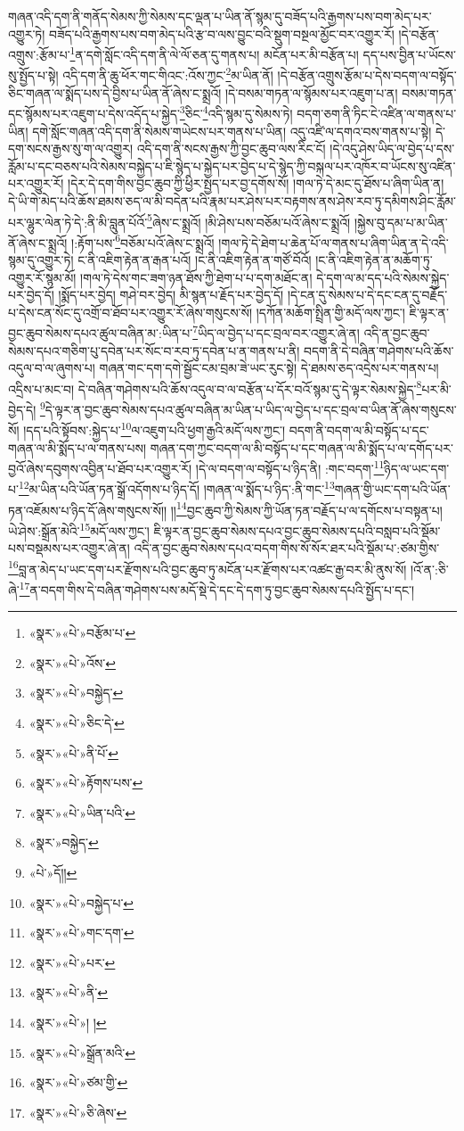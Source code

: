 གཞན་འདི་དག་ནི་གནོད་སེམས་ཀྱི་སེམས་དང་ལྡན་པ་ཡིན་ནོ་སྙམ་དུ་བཟོད་པའི་རྒྱགས་པས་བག་མེད་པར་འགྱུར་ཏེ། བཟོད་པའི་རྒྱགས་པས་བག་མེད་པའི་རྩ་བ་ལས་བྱུང་བའི་སྡུག་བསྔལ་མྱོང་བར་འགྱུར་རོ། །དེ་བརྩོན་འགྲུས་:རྩོམ་པ་\footnote{«སྣར་»«པེ་»བརྩོམ་པ་}ན་དགེ་སློང་འདི་དག་ནི་ལེ་ལོ་ཅན་དུ་གནས་པ། མངོན་པར་མི་བརྩོན་པ། དད་པས་བྱིན་པ་ཡོངས་སུ་སྤྱོད་པ་སྟེ། འདི་དག་ནི་ཆུ་ཕོར་གང་གིའང་:འོས་ཀྱང་\footnote{«སྣར་»«པེ་»འོས་}མ་ཡིན་ནོ། །དེ་བརྩོན་འགྲུས་རྩོམ་པ་དེས་བདག་ལ་བསྟོད་ཅིང་གཞན་ལ་སྨོད་པས་དེ་བྱིས་པ་ཡིན་ནོ་ཞེས་ང་སྨྲའོ། །དེ་བསམ་གཏན་ལ་སྙོམས་པར་འཇུག་པ་ན། བསམ་གཏན་དང་སྙོམས་པར་འཇུག་པ་དེས་འདོད་པ་སྐྱེད་\footnote{«སྣར་»«པེ་»བསྐྱེད་}ཅིང་\footnote{«སྣར་»«པེ་»ཅིང་དེ་}འདི་སྙམ་དུ་སེམས་ཏེ། བདག་ཅག་ནི་ཏིང་ངེ་འཛིན་ལ་གནས་པ་ཡིན། དགེ་སློང་གཞན་འདི་དག་ནི་སེམས་གཡེངས་པར་གནས་པ་ཡིན། འདུ་འཛི་ལ་དགའ་བས་གནས་པ་སྟེ། དེ་དག་སངས་རྒྱས་སུ་ག་ལ་འགྱུར། འདི་དག་ནི་སངས་རྒྱས་ཀྱི་བྱང་ཆུབ་ལས་རིང་ངོ། །དེ་འདུ་ཤེས་ཡིད་ལ་བྱེད་པ་དས་རློམ་པ་དང་བཅས་པའི་སེམས་བསྐྱེད་པ་ཇི་སྙེད་པ་སྐྱེད་པར་བྱེད་པ་དེ་སྙེད་ཀྱི་བསྐལ་པར་འཁོར་བ་ཡོངས་སུ་འཛིན་པར་འགྱུར་རོ། །དེར་དེ་དག་གིས་བྱང་ཆུབ་ཀྱི་ཕྱིར་སྤྱད་པར་བྱ་དགོས་སོ། །གལ་ཏེ་དེ་མང་དུ་ཐོས་པ་ཞིག་ཡིན་ན། དེ་ཡི་གེ་མེད་པའི་ཆོས་ཐམས་ཅད་ལ་མི་བདེན་པའི་རྣམ་པར་ཤེས་པར་བརྟགས་ནས་ཤེས་རབ་ཏུ་དམིགས་ཤིང་རློམ་པར་ལྷུར་ལེན་ཏེ་དེ་:ནི་མི་བླུན་པོའོ་\footnote{«སྣར་»«པེ་»ནི་པོ་}ཞེས་ང་སྨྲའོ། །མི་ཤེས་པས་བཅོམ་པའོ་ཞེས་ང་སྨྲའོ། །སྐྱེས་བུ་དམ་པ་མ་ཡིན་ནོ་ཞེས་ང་སྨྲའོ། །:རྟོག་པས་\footnote{«སྣར་»«པེ་»རྟོགས་པས་}བཅོམ་པའོ་ཞེས་ང་སྨྲའོ། །གལ་ཏེ་དེ་ཐེག་པ་ཆེན་པོ་ལ་གནས་པ་ཞིག་ཡིན་ན་དེ་འདི་སྙམ་དུ་འགྱུར་ཏེ། ང་ནི་འཇིག་རྟེན་ན་རྒན་པའོ། །ང་ནི་འཇིག་རྟེན་ན་གཙོ་བོའོ། །ང་ནི་འཇིག་རྟེན་ན་མཆོག་ཏུ་འགྱུར་རོ་སྙམ་མོ། །གལ་ཏེ་དེས་གང་ཟག་ཉན་ཐོས་ཀྱི་ཐེག་པ་པ་དག་མཐོང་ན། དེ་དག་ལ་མ་དད་པའི་སེམས་སྐྱེད་པར་བྱེད་དོ། །སྨོད་པར་བྱེད། གཤེ་བར་བྱེད། མི་སྙན་པ་རྗོད་པར་བྱེད་དོ། །དེ་ངན་དུ་སེམས་པ་དེ་དང་ངན་དུ་བརྗོད་པ་དེས་ངན་སོང་དུ་འགྲོ་བ་ཐོབ་པར་འགྱུར་རོ་ཞེས་གསུངས་སོ། །དཀོན་མཆོག་སྤྲིན་གྱི་མདོ་ལས་ཀྱང་། ཇི་ལྟར་ན་བྱང་ཆུབ་སེམས་དཔའ་ཚུལ་བཞིན་མ་:ཡིན་པ་\footnote{«སྣར་»«པེ་»ཡིན་པའི་}ཡིད་ལ་བྱེད་པ་དང་བྲལ་བར་འགྱུར་ཞེ་ན། འདི་ན་བྱང་ཆུབ་སེམས་དཔའ་གཅིག་པུ་དབེན་པར་སོང་བ་རབ་ཏུ་དབེན་པ་ན་གནས་པ་ནི། བདག་ནི་དེ་བཞིན་གཤེགས་པའི་ཆོས་འདུལ་བ་ལ་ཞུགས་པ། གཞན་གང་དག་དགེ་སྦྱོང་ངམ་བྲམ་ཟེ་ཡང་རུང་སྟེ། དེ་ཐམས་ཅད་འདྲེས་པར་གནས་པ། འདྲིས་པ་མང་བ། དེ་བཞིན་གཤེགས་པའི་ཆོས་འདུལ་བ་ལ་བརྩོན་པ་དོར་བའོ་སྙམ་དུ་དེ་ལྟར་སེམས་སྐྱེད་\footnote{«སྣར་»བསྐྱེད་}པར་མི་བྱེད་དེ། \footnote{«པེ་»དོ།། }དེ་ལྟར་ན་བྱང་ཆུབ་སེམས་དཔའ་ཚུལ་བཞིན་མ་ཡིན་པ་ཡིད་ལ་བྱེད་པ་དང་བྲལ་བ་ཡིན་ནོ་ཞེས་གསུངས་སོ། །དད་པའི་སྟོབས་:སྐྱེད་པ་\footnote{«སྣར་»«པེ་»བསྐྱེད་པ་}ལ་འཇུག་པའི་ཕྱག་རྒྱའི་མདོ་ལས་ཀྱང་། བདག་ནི་བདག་ལ་མི་བསྟོད་པ་དང་གཞན་ལ་མི་སྨོད་པ་ལ་གནས་པས། གཞན་དག་ཀྱང་བདག་ལ་མི་བསྟོད་པ་དང་གཞན་ལ་མི་སྨོད་པ་ལ་དགོད་པར་བྱའོ་ཞེས་དབུགས་འབྱིན་པ་ཐོབ་པར་འགྱུར་རོ། །དེ་ལ་བདག་ལ་བསྟོད་པ་ཉིད་ནི། :གང་བདག་\footnote{«སྣར་»«པེ་»གང་དག་}ཉིད་ལ་ཡང་དག་པ་\footnote{«སྣར་»«པེ་»པར་}མ་ཡིན་པའི་ཡོན་ཏན་སྒྲོ་འདོགས་པ་ཉིད་དོ། །གཞན་ལ་སྨོད་པ་ཉིད་:ནི་གང་\footnote{«སྣར་»«པེ་»ནི་}གཞན་གྱི་ཡང་དག་པའི་ཡོན་ཏན་འཇོམས་པ་ཉིད་དོ་ཞེས་གསུངས་སོ།། །།\footnote{«སྣར་»«པེ་»། །}བྱང་ཆུབ་ཀྱི་སེམས་ཀྱི་ཡོན་ཏན་བརྗོད་པ་ལ་དགོངས་པ་བསྟན་པ། ཡེ་ཤེས་:སྒྲོན་མེའི་\footnote{«སྣར་»«པེ་»སྒྲོན་མའི་}མདོ་ལས་ཀྱང་། ཇི་ལྟར་ན་བྱང་ཆུབ་སེམས་དཔའ་བྱང་ཆུབ་སེམས་དཔའི་བསླབ་པའི་སྡོམ་པས་བསྡམས་པར་འགྱུར་ཞེ་ན། འདི་ན་བྱང་ཆུབ་སེམས་དཔའ་བདག་གིས་སོ་སོར་ཐར་པའི་སྡོམ་པ་:ཙམ་གྱིས་\footnote{«སྣར་»«པེ་»ཙམ་གྱི་}བླ་ན་མེད་པ་ཡང་དག་པར་རྫོགས་པའི་བྱང་ཆུབ་ཏུ་མངོན་པར་རྫོགས་པར་འཚང་རྒྱ་བར་མི་ནུས་སོ། །འོ་ན་:ཅི་ཞེ་\footnote{«སྣར་»«པེ་»ཅི་ཞེས་}ན་བདག་གིས་དེ་བཞིན་གཤེགས་པས་མདོ་སྡེ་དེ་དང་དེ་དག་ཏུ་བྱང་ཆུབ་སེམས་དཔའི་སྤྱོད་པ་དང་། 
